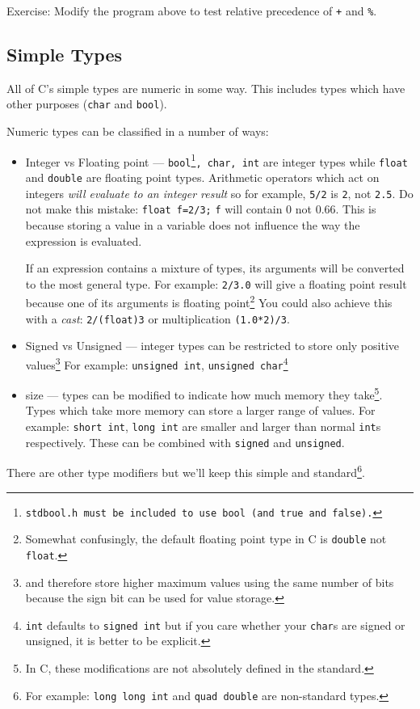 \noindent Exercise: Modify the program above to test relative precedence of \texttt{+} and \texttt{\%}.

\subsection{Simple Types}
All of C's simple types are numeric in some way.
This includes types which have other purposes (\texttt{char} and \texttt{bool}).

Numeric types can be classified in a number of ways:
\begin{itemize}
 \item Integer vs Floating point --- \texttt{bool\footnote{\texttt{stdbool.h} must be included to use \texttt{bool} (and \texttt{true} and \texttt{false}).}, char, int} are integer types while \texttt{float} and \texttt{double} are floating point types.
Arithmetic operators which act on integers \emph{will evaluate to an integer result} so for example, \texttt{5/2} is \texttt{2}, not \texttt{2.5}.
Do not make this mistake:
\texttt{float f=2/3;}
\texttt{f} will contain $0$ not $0.66$.
This is because storing a value in a variable does not influence the way the expression is evaluated.

If an expression contains a mixture of types, its arguments will be converted to the most general type.
For example:
\texttt{2/3.0} will give a floating point result because one of its arguments is floating point\footnote{Somewhat confusingly, the default floating point type in C is \texttt{double} not \texttt{float}.}
You could also achieve this with a \emph{cast}: \texttt{2/(float)3} or multiplication \texttt{(1.0*2)/3}.

 \item Signed vs Unsigned --- integer types can be restricted to store only positive values\footnote{and therefore store higher maximum values using the same number of bits because the sign bit can be used for value storage.}
 For example: \texttt{unsigned int}, \texttt{unsigned char}\footnote{\texttt{int} defaults to \texttt{signed int} but if you care whether your \texttt{char}s are signed or unsigned, it is better to be explicit.}
 
 \item size --- types can be modified to indicate how much memory they take\footnote{In C, these modifications are not absolutely defined in the standard.}. 
 Types which take more memory can store a larger range of values.
 For example:  \texttt{short int}, \texttt{long int} are smaller and larger than normal \texttt{int}s respectively.
 These can be combined with \texttt{signed} and \texttt{unsigned}.
\end{itemize}
There are other type modifiers but we'll keep this simple and standard\footnote{For example: \texttt{long long int}  and \texttt{quad double} are non-standard types.}.


